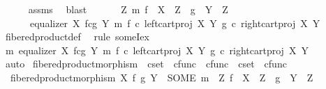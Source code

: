 \begin{isabellebody}
\ \ \ \ \isamarkupfalse%
\ assms\ \isamarkupfalse%
\ blast\isanewline
\ \ \isamarkupfalse%
\ \isamarkupfalse%
\ {\isachardoublequoteopen}{\isasymexists}\ Z\ m{\isachardot}{\kern0pt}\ f\ {\isacharcolon}{\kern0pt}\ X\ {\isasymrightarrow}\ Z\ {\isasymand}\ g\ {\isacharcolon}{\kern0pt}\ Y\ {\isasymrightarrow}\ Z\ {\isasymand}\ \isanewline
\ \ \ \ \ \ equalizer\ {\isacharparenleft}{\kern0pt}X\ \isactrlbsub f\isactrlesub {\isasymtimes}\isactrlsub c\isactrlbsub g\isactrlesub \ Y{\isacharparenright}{\kern0pt}\ m\ {\isacharparenleft}{\kern0pt}f\ {\isasymcirc}\isactrlsub c\ left{\isacharunderscore}{\kern0pt}cart{\isacharunderscore}{\kern0pt}proj\ X\ Y{\isacharparenright}{\kern0pt}\ {\isacharparenleft}{\kern0pt}g\ {\isasymcirc}\isactrlsub c\ right{\isacharunderscore}{\kern0pt}cart{\isacharunderscore}{\kern0pt}proj\ X\ Y{\isacharparenright}{\kern0pt}{\isachardoublequoteclose}\isanewline
\ \ \ \ \isamarkupfalse%
\ fibered{\isacharunderscore}{\kern0pt}product{\isacharunderscore}{\kern0pt}def\ \isamarkupfalse%
\ {\isacharparenleft}{\kern0pt}rule\ someI{\isacharunderscore}{\kern0pt}ex{\isacharparenright}{\kern0pt}\isanewline
\ \ \isamarkupfalse%
\ \isamarkupfalse%
\ {\isachardoublequoteopen}{\isasymexists}m{\isachardot}{\kern0pt}\ equalizer\ {\isacharparenleft}{\kern0pt}X\ \isactrlbsub f\isactrlesub {\isasymtimes}\isactrlsub c\isactrlbsub g\isactrlesub \ Y{\isacharparenright}{\kern0pt}\ m\ {\isacharparenleft}{\kern0pt}f\ {\isasymcirc}\isactrlsub c\ left{\isacharunderscore}{\kern0pt}cart{\isacharunderscore}{\kern0pt}proj\ X\ Y{\isacharparenright}{\kern0pt}\ {\isacharparenleft}{\kern0pt}g\ {\isasymcirc}\isactrlsub c\ right{\isacharunderscore}{\kern0pt}cart{\isacharunderscore}{\kern0pt}proj\ X\ Y{\isacharparenright}{\kern0pt}{\isachardoublequoteclose}\isanewline
\ \ \ \ \isamarkupfalse%
\ auto\isanewline
{}\isamarkupfalse%
%
\endisatagproof
{\isafoldproof}%
%
\isadelimproof
\isanewline
%
\endisadelimproof
\isanewline
{}\isamarkupfalse%
\ fibered{\isacharunderscore}{\kern0pt}product{\isacharunderscore}{\kern0pt}morphism\ {\isacharcolon}{\kern0pt}{\isacharcolon}{\kern0pt}\ {\isachardoublequoteopen}cset\ {\isasymRightarrow}\ cfunc\ {\isasymRightarrow}\ cfunc\ {\isasymRightarrow}\ cset\ {\isasymRightarrow}\ cfunc{\isachardoublequoteclose}\ \isanewline
\ \ {\isachardoublequoteopen}fibered{\isacharunderscore}{\kern0pt}product{\isacharunderscore}{\kern0pt}morphism\ X\ f\ g\ Y\ {\isacharequal}{\kern0pt}\ {\isacharparenleft}{\kern0pt}SOME\ m{\isachardot}{\kern0pt}\ {\isasymexists}\ Z{\isachardot}{\kern0pt}\ f\ {\isacharcolon}{\kern0pt}\ X\ {\isasymrightarrow}\ Z\ {\isasymand}\ g\ {\isacharcolon}{\kern0pt}\ Y\ {\isasymrightarrow}\ Z\ {\isasymand}\isanewline

\end{isabellebody}

